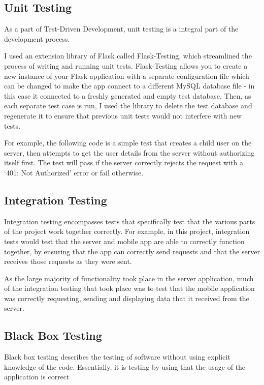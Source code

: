 \subsection{Unit Testing} 
As a part of Test-Driven Development, unit testing is a integral part of the development process.

I used an extension library of Flask called Flask-Testing, which streamlined the process of writing and running unit tests.
Flask-Testing allows you to create a new instance of your Flask application with a separate configuration file which can be changed to make the app connect to a different MySQL database file - in this case it connected to a freshly generated and empty test database.
Then, as each separate test case is run, I used the library to delete the test database and regenerate it to ensure that previous unit tests would not interfere with new tests.

For example, the following code is a simple test that creates a child user on the server, then attempts to get the user details from the server without authorizing itself first. 
The test will pass if the server correctly rejects the request with a `401: Not Authorized' error or fail otherwise.


\subsection{Integration Testing}
Integration testing encompasses tests that specifically test that the various parts of the project work together correctly.
For example, in this project, integration tests would test that the server and mobile app are able to correctly function together, by ensuring that the app can correctly send requests and that the server receives those requests as they were sent.

As the large majority of functionality took place in the server application, much of the integration testing that took place was to test that the mobile application was correctly requesting, sending and displaying data that it received from the server.


\subsection{Black Box Testing}
Black box testing describes the testing of software without using explicit knowledge of the code.
Essentially, it is testing by using that the usage of the application is correct

